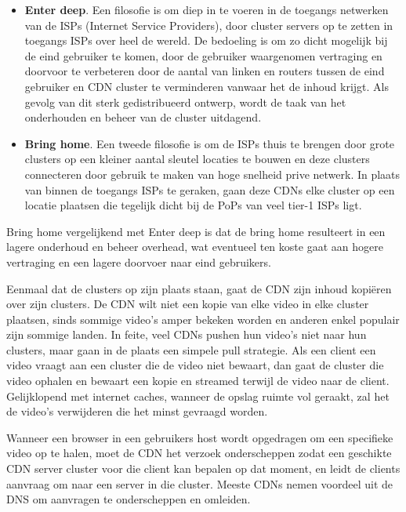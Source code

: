 \begin{itemize}
   \item \textbf{Enter deep}. Een filosofie is om diep in te voeren in de toegangs netwerken van de ISPs (Internet Service Providers), door cluster servers op te zetten in toegangs ISPs over heel de wereld. De bedoeling is om zo dicht mogelijk bij de eind gebruiker te komen, door de gebruiker waargenomen vertraging en doorvoor te verbeteren door de aantal van linken en routers tussen de eind gebruiker en CDN cluster te verminderen vanwaar het de inhoud krijgt. Als gevolg van dit sterk gedistribueerd ontwerp, wordt de taak van het onderhouden en beheer van de cluster uitdagend.
 \item \textbf{Bring home}. Een tweede filosofie is om de ISPs thuis te brengen door grote clusters op een kleiner aantal sleutel locaties te bouwen en deze clusters connecteren door gebruik te maken van hoge snelheid prive netwerk. In plaats van binnen de toegangs ISPs te geraken, gaan deze CDNs  elke cluster op een locatie plaatsen die tegelijk dicht bij de PoPs van veel tier-1 ISPs ligt.
\end{itemize}

\noindent Bring home vergelijkend met Enter deep is dat de bring home resulteert in een lagere onderhoud en beheer overhead, wat eventueel ten koste gaat aan hogere vertraging en een lagere doorvoer naar eind gebruikers.

\noindent Eenmaal dat de clusters op zijn plaats staan, gaat de CDN zijn inhoud kopiëren over zijn clusters. De CDN wilt niet een kopie van elke video in elke cluster plaatsen, sinds sommige video’s amper bekeken worden en anderen enkel populair zijn sommige landen. In feite, veel CDNs pushen hun video’s niet naar hun clusters, maar gaan in de plaats een simpele pull strategie. Als een client een video vraagt aan een cluster die de video niet bewaart, dan gaat de cluster die video ophalen en bewaart een kopie en streamed terwijl de video naar de client. Gelijklopend met internet caches, wanneer de opslag ruimte vol geraakt, zal het de video’s verwijderen die het minst gevraagd worden.


Wanneer  een browser in een gebruikers host wordt opgedragen om een specifieke video op te halen, moet de CDN het verzoek onderscheppen zodat een geschikte CDN server cluster voor die client kan bepalen op dat moment, en leidt de clients aanvraag om naar een server in die cluster.
Meeste CDNs nemen voordeel uit de DNS om aanvragen te onderscheppen en omleiden.



